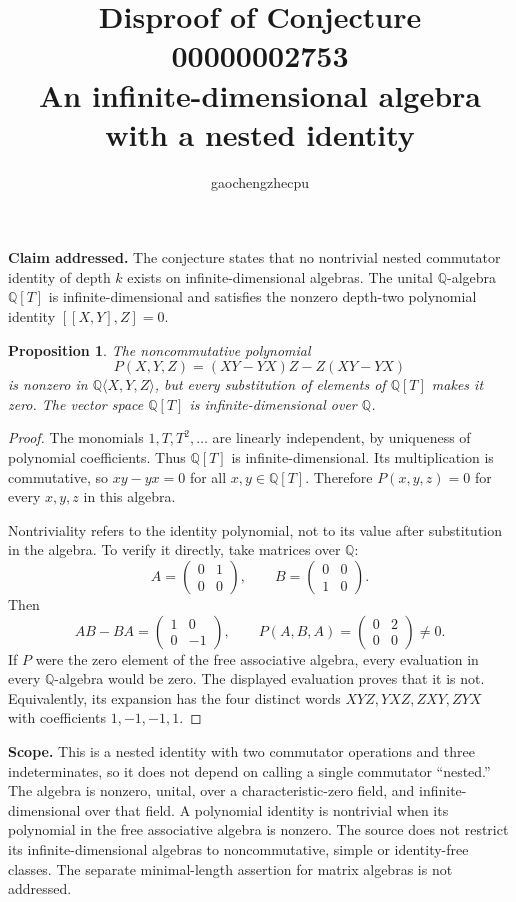 \documentclass[11pt]{article}
\title{Disproof of Conjecture 00000002753\\An infinite-dimensional algebra with a nested identity}
\author{gaochengzhecpu}\date{}
\newtheorem{proposition}{Proposition}
\begin{document}
\maketitle
\noindent\textbf{Claim addressed.} The conjecture states that no nontrivial nested commutator identity of depth $k$ exists on infinite-dimensional algebras. The unital $\mathbb Q$-algebra $\mathbb Q[T]$ is infinite-dimensional and satisfies the nonzero depth-two polynomial identity $[[X,Y],Z]=0$.

\begin{proposition}
The noncommutative polynomial
\[
 P(X,Y,Z)=(XY-YX)Z-Z(XY-YX)
\]
is nonzero in $\mathbb Q\langle X,Y,Z\rangle$, but every substitution of elements of $\mathbb Q[T]$ makes it zero. The vector space $\mathbb Q[T]$ is infinite-dimensional over $\mathbb Q$.
\end{proposition}
\begin{proof}
The monomials $1,T,T^2,\ldots$ are linearly independent, by uniqueness of polynomial coefficients. Thus $\mathbb Q[T]$ is infinite-dimensional. Its multiplication is commutative, so $xy-yx=0$ for all $x,y\in\mathbb Q[T]$. Therefore $P(x,y,z)=0$ for every $x,y,z$ in this algebra.

Nontriviality refers to the identity polynomial, not to its value after substitution in the algebra. To verify it directly, take matrices over $\mathbb Q$:
\[
 A=\begin{pmatrix}0&1\\0&0\end{pmatrix},\qquad
 B=\begin{pmatrix}0&0\\1&0\end{pmatrix}.
\]
Then
\[
 AB-BA=\begin{pmatrix}1&0\\0&-1\end{pmatrix},\qquad
 P(A,B,A)=\begin{pmatrix}0&2\\0&0\end{pmatrix}\ne0.
\]
If $P$ were the zero element of the free associative algebra, every evaluation in every $\mathbb Q$-algebra would be zero. The displayed evaluation proves that it is not. Equivalently, its expansion has the four distinct words $XYZ,YXZ,ZXY,ZYX$ with coefficients $1,-1,-1,1$.
\end{proof}

\noindent\textbf{Scope.} This is a nested identity with two commutator operations and three indeterminates, so it does not depend on calling a single commutator ``nested.'' The algebra is nonzero, unital, over a characteristic-zero field, and infinite-dimensional over that field. A polynomial identity is nontrivial when its polynomial in the free associative algebra is nonzero. The source does not restrict its infinite-dimensional algebras to noncommutative, simple or identity-free classes. The separate minimal-length assertion for matrix algebras is not addressed.
\end{document}

